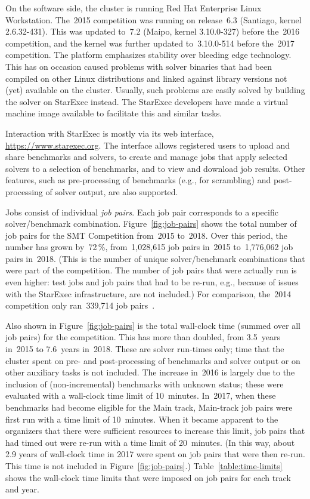 \documentclass[dvipsnames,table,twoside,11pt]{article}
\begin{document}
On the software side, the cluster is running Red Hat Enterprise Linux
Workstation.  The~2015 competition was running on release~6.3
(Santiago, kernel 2.6.32-431).  This was updated to~7.2 (Maipo, kernel
3.10.0-327) before the~2016 competition, and the kernel was further
updated to~3.10.0-514 before the~2017 competition.  The platform
emphasizes stability over bleeding edge technology.  This has on
occasion caused problems with solver binaries that had been compiled
on other Linux distributions and linked against library versions not
(yet) available on the cluster.  Usually, such problems are easily
solved by building the solver on StarExec instead.  The StarExec
developers have made a virtual machine image available to facilitate
this and similar tasks.

Interaction with StarExec is mostly via its web interface,
\url{https://www.starexec.org}.  The interface allows registered users
to upload and share benchmarks and solvers, to create and manage jobs
that apply selected solvers to a selection of benchmarks, and to view
and download job results.  Other features, such as pre-processing of
benchmarks (e.g., for scrambling) and post-processing of solver
output, are also supported.

Jobs consist of individual \emph{job pairs}.  Each job pair
corresponds to a specific solver/benchmark combination.
Figure~\ref{fig:job-pairs} shows the total number of job pairs for the
SMT Competition from~2015 to~2018.  Over this period, the number has
grown by~72\,\%, from~1,028,615 job pairs in~2015 to~1,776,062 job
pairs in~2018.  (This is the number of unique solver/benchmark
combinations that were part of the competition.  The number of job
pairs that were actually run is even higher: test jobs and job pairs
that had to be re-run, e.g., because of issues with the StarExec
infrastructure, are not included.)  For comparison, the~2014
competition only ran~339,714 job pairs~\cite{CDW14}.

Also shown in Figure~\ref{fig:job-pairs} is the total wall-clock time
(summed over all job pairs) for the competition.  This has more than
doubled, from 3.5~years in~2015 to 7.6~years in~2018.  These are
solver run-times only; time that the cluster spent on pre- and
post-processing of benchmarks and solver output or on other auxiliary
tasks is not included.  The increase in~2016 is largely due to the
inclusion of (non-incremental) benchmarks with unknown status; these
were evaluated with a wall-clock time limit of 10~minutes.  In~2017,
when these benchmarks had become eligible for the Main track,
Main-track job pairs were first run with a time limit of 10~minutes.
When it became apparent to the organizers that there were sufficient
resources to increase this limit, job pairs that had timed out were
re-run with a time limit of 20~minutes.  (In this way, about 2.9 years
of wall-clock time in 2017 were spent on job pairs that were then
re-run.  This time is not included in Figure~\ref{fig:job-pairs}.)
Table~\ref{table:time-limits} shows the wall-clock time limits that
were imposed on job pairs for each track and year.
\end{document}
